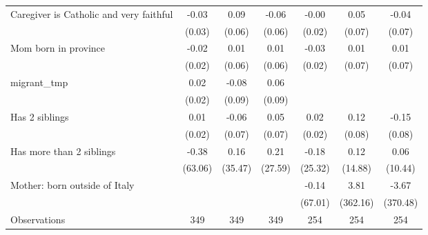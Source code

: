 {\begin{tabular}{l*{6}{c}}
\addlinespace
Caregiver is Catholic and very faithful&       -0.03         &        0.09         &       -0.06         &       -0.00         &        0.05         &       -0.04         \\
                    &      (0.03)         &      (0.06)         &      (0.06)         &      (0.02)         &      (0.07)         &      (0.07)         \\
\addlinespace
Mom born in province&       -0.02         &        0.01         &        0.01         &       -0.03         &        0.01         &        0.01         \\
                    &      (0.02)         &      (0.06)         &      (0.06)         &      (0.02)         &      (0.07)         &      (0.07)         \\
\addlinespace
migrant\_tmp         &        0.02         &       -0.08         &        0.06         &                     &                     &                     \\
                    &      (0.02)         &      (0.09)         &      (0.09)         &                     &                     &                     \\
\addlinespace
Has 2 siblings      &        0.01         &       -0.06         &        0.05         &        0.02         &        0.12         &       -0.15         \\
                    &      (0.02)         &      (0.07)         &      (0.07)         &      (0.02)         &      (0.08)         &      (0.08)         \\
\addlinespace
Has more than 2 siblings&       -0.38         &        0.16         &        0.21         &       -0.18         &        0.12         &        0.06         \\
                    &     (63.06)         &     (35.47)         &     (27.59)         &     (25.32)         &     (14.88)         &     (10.44)         \\
\addlinespace
Mother: born outside of Italy&                     &                     &                     &       -0.14         &        3.81         &       -3.67         \\
                    &                     &                     &                     &     (67.01)         &    (362.16)         &    (370.48)         \\
\midrule
Observations        &         349         &         349         &         349         &         254         &         254         &         254         \\
\bottomrule
\end{tabular}
}
